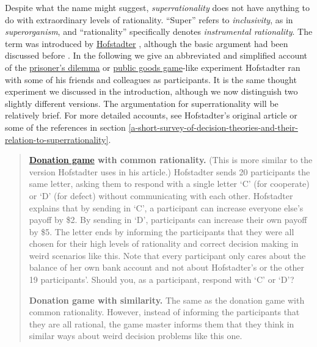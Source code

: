 Despite what the name might suggest, \emph{superrationality} does not
have anything to do with extraordinary levels of rationality. ``Super''
refers to \emph{inclusivity}, as in \emph{superorganism}, and
``rationality'' specifically denotes \emph{instrumental rationality}.
The term was introduced by
\href{https://en.wikipedia.org/wiki/Douglas_Hofstadter}{Hofstadter}
\citeyear{Hofstadter1983-az}, although the basic argument
had been discussed before
\parencite{Davis1977-iw,Horgan1981-hb}. In the following we
give an abbreviated and simplified account of the
\href{https://en.wikipedia.org/wiki/Prisoner\%27s_dilemma}{prisoner's
dilemma} or
\href{https://en.wikipedia.org/wiki/Public_goods_game}{public
goods game}-like experiment Hofstadter ran with some of his friends and
colleagues as participants. It is the same thought experiment we
discussed in the introduction, although we now distinguish two slightly
different versions. The argumentation for superrationality will be
relatively brief. For more detailed accounts, see Hofstadter's
original
article or some of the references in section
\ref{a-short-survey-of-decision-theories-and-their-relation-to-superrationality}.

\begin{quote}
\textbf{\href{https://en.wikipedia.org/wiki/Prisoner\%27s_dilemma\#Special_case:_Donation_game}{Donation
game} with common rationality.} (This is more similar to the version
Hofstadter uses in his article.) Hofstadter sends 20 participants the
same letter, asking them to respond with a single letter `C' (for
cooperate) or `D' (for defect) without communicating with each other.
Hofstadter explains that by sending in `C', a participant can increase
everyone else's payoff by \$2. By sending in `D', participants can
increase their own payoff by \$5. The letter ends by informing the
participants that they were all chosen for their high levels of
rationality and correct decision making in weird scenarios like this.
Note that every participant only cares about the balance of her own bank
account and not about Hofstadter's or the other 19 participants'. Should
you, as a participant, respond with `C' or `D'?

\textbf{Donation game with similarity.} The same as the donation game
with common rationality. However, instead of informing the participants
that they are all rational, the game master informs them that they think
in similar ways about weird decision problems like this one.
\end{quote}

